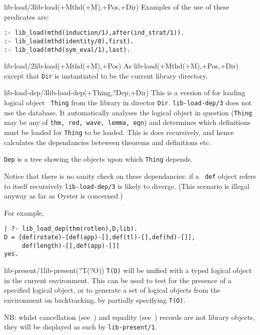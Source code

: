 \begin{predicate}{lib-load/3}{lib-load(+Mthd(+M),+Pos,+Dir)}
Examples of the use of these predicates are:
\begin{verbatim}
:- lib_load(mthd(induction/1),after(ind_strat/1)).
:- lib_load(mthd(identity/0),first).
:- lib_load(mthd(sym_eval/1),last).
\end{verbatim}
\end{predicate}


\begin{predicate}{lib-load/2}{lib-load(+Mthd(+M),+Pos)}%
As lib-load(+Mthd(+M),+Pos,+Dir) except that {\tt Dir}
is instantiated to be the current library directory. 
\end{predicate}

\begin{predicate}{lib-load-dep/3}{lib-load-dep(+Thing,?Dep,+Dir)}%
This is a version of  for loading logical object {\tt
Thing} from the library in director {\tt Dir}.  {\tt lib-load-dep/3}
does not use the  database.  It automatically analyses the
logical object in question ({\tt Thing} may be any of {\tt thm, red,
wave, lemma, eqn}) and determines which definitions must be loaded for
{\tt Thing} to be loaded.  This is does recursively, and hence
calculates the dependancies beteween theorems and definitions etc. 

{\tt Dep} is a tree showing the objects upon which {\tt Thing}
depends. 

Notice that there is no sanity check on these dependancies: if a {\tt
def} object refers to itself recursively {\tt lib-load-dep/3} is
likely to diverge.  (This scenario is illegal anyway as far as Oyster
is concerned.)


For example,
\begin{verbatim}
| ?- lib_load_dep(thm(rotlen),D,lib).
D = [def(rotate)-[def(app)-[],def(tl)-[],def(hd)-[]],
     def(length)-[],def(app)-[]]
yes.
\end{verbatim}

\end{predicate}


\begin{predicate}{lib-present/1}{lib-present(?T(?O))}%
{\tt T(O)} will be unified with a typed logical object in the current
environment. This can be used to test for the presence of a specified
logical object, or to generate a set of logical objects from the
environment on backtracking, by partially specifying {\tt T(O)}.

NB: whilst cancellation (see~) and equality
(see~) records are not library objects, they will be
displayed as such by {\tt lib-present/1}.
\end{predicate}

